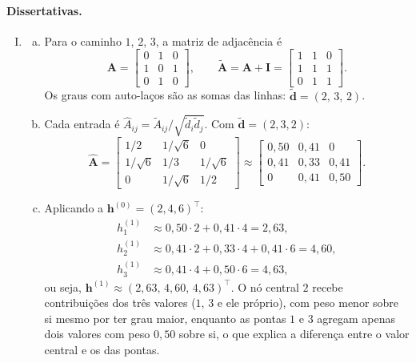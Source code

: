 \documentclass{dlproblemset}
\begin{document}
\paragraph{Dissertativas.}
\begin{enumerate}[I)]
    \item
    \begin{enumerate}[(a)]
        \item Para o caminho $1$, $2$, $3$, a matriz de adjacência é
        \[
            \mathbf{A} = \begin{bmatrix} 0 & 1 & 0 \\ 1 & 0 & 1 \\ 0 & 1 & 0 \end{bmatrix},
            \qquad
            \tilde{\mathbf{A}} = \mathbf{A} + \mathbf{I} = \begin{bmatrix} 1 & 1 & 0 \\ 1 & 1 & 1 \\ 0 & 1 & 1 \end{bmatrix}.
        \]
        Os graus com auto-laços são as somas das linhas: $\tilde{\mathbf{d}} = (2,\, 3,\, 2)$.
        \item Cada entrada é $\hat A_{ij} = \tilde A_{ij}/\sqrt{\tilde d_i \tilde d_j}$. Com $\tilde{\mathbf{d}} = (2,3,2)$:
        \[
            \hat{\mathbf{A}} = \begin{bmatrix}
                1/2 & 1/\sqrt{6} & 0 \\
                1/\sqrt{6} & 1/3 & 1/\sqrt{6} \\
                0 & 1/\sqrt{6} & 1/2
            \end{bmatrix}
            \approx \begin{bmatrix}
                0{,}50 & 0{,}41 & 0 \\
                0{,}41 & 0{,}33 & 0{,}41 \\
                0 & 0{,}41 & 0{,}50
            \end{bmatrix}.
        \]
        \item Aplicando a $\mathbf{h}^{(0)} = (2,4,6)^\top$:
        \begin{align*}
            h^{(1)}_1 &\approx 0{,}50 \cdot 2 + 0{,}41 \cdot 4 = 2{,}63, \\
            h^{(1)}_2 &\approx 0{,}41 \cdot 2 + 0{,}33 \cdot 4 + 0{,}41 \cdot 6 = 4{,}60, \\
            h^{(1)}_3 &\approx 0{,}41 \cdot 4 + 0{,}50 \cdot 6 = 4{,}63,
        \end{align*}
        ou seja, $\mathbf{h}^{(1)} \approx (2{,}63,\, 4{,}60,\, 4{,}63)^\top$. O nó central $2$ recebe contribuições dos três valores ($1$, $3$ e ele próprio), com peso menor sobre si mesmo por ter grau maior, enquanto as pontas $1$ e $3$ agregam apenas dois valores com peso $0{,}50$ sobre si, o que explica a diferença entre o valor central e os das pontas.
    \end{enumerate}


\end{enumerate}
\end{document}
